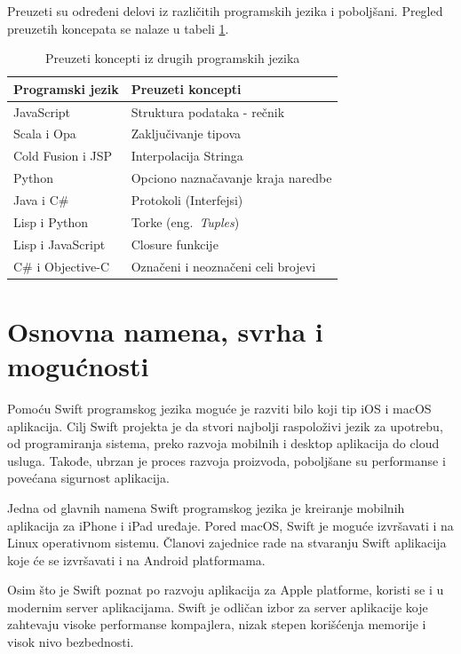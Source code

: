 \documentclass[a4paper]{article}
\begin{document}
Preuzeti su određeni delovi iz različitih programskih jezika i poboljšani. Pregled preuzetih koncepata se nalaze u tabeli \ref{tab:koncepti}.

\begin{table}[h!]
\begin{center}
\caption{Preuzeti koncepti iz drugih programskih jezika}
\begin{tabular}{|l|l|} \hline
\label{tab:koncepti}
\textbf{Programski jezik} & \textbf{Preuzeti koncepti} \\ \hline
JavaScript & Struktura podataka - rečnik  \\ \hline
Scala i Opa & Zaključivanje tipova \\ \hline
Cold Fusion i JSP & Interpolacija Stringa \\ \hline
Python & Opciono naznačavanje kraja naredbe \\ \hline
Java i C\# & Protokoli (Interfejsi) \\ \hline
Lisp i Python & Torke (eng.~{\em Tuples}) \\ \hline
Lisp i JavaScript &  Closure funkcije \\ \hline
C\# i Objective-C & Označeni i neoznačeni celi brojevi \\ \hline
\end{tabular}
\end{center}
\end{table}

\section{Osnovna namena, svrha i mogućnosti}	
\label{sec:treciDeo}
Pomoću Swift programskog jezika moguće je razviti bilo koji tip iOS i macOS aplikacija. Cilj Swift projekta je da stvori najbolji raspoloživi jezik za upotrebu, od programiranja sistema, preko razvoja mobilnih i desktop aplikacija do cloud usluga. Takođe, ubrzan je proces razvoja proizvoda, poboljšane su performanse i povećana sigurnost aplikacija.

Jedna od glavnih namena Swift programskog jezika je kreiranje mobilnih aplikacija za iPhone i iPad uređaje. Pored macOS, Swift je moguće izvršavati i na Linux operativnom sistemu. Članovi zajednice rade na stvaranju Swift aplikacija koje će se izvršavati i na Android platformama.

Osim što je Swift poznat po razvoju aplikacija za Apple platforme, koristi se i u modernim server aplikacijama. Swift je odličan izbor za server aplikacije koje zahtevaju visoke performanse kompajlera, nizak stepen korišćenja memorije i visok nivo bezbednosti.
\end{document}
